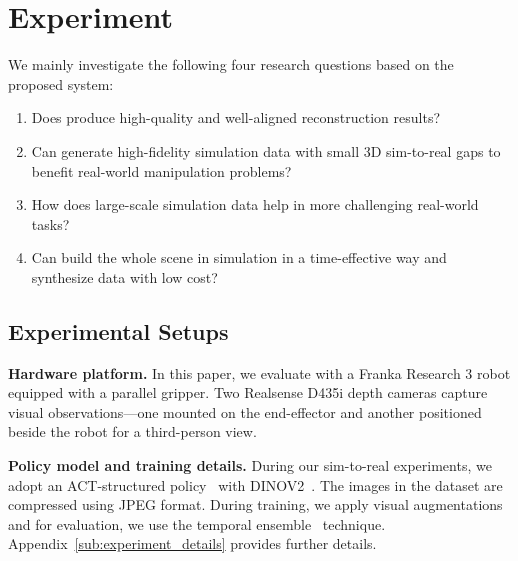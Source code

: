 \section{Experiment}
\label{sec:experiment}
We mainly investigate the following four research questions based on the proposed \our system:
\begin{enumerate}[label=\textbf{Q\arabic*}]
    \item Does \our produce high-quality and well-aligned reconstruction results?
    \label{ques:1}
    \item Can \our generate high-fidelity simulation data with small 3D sim-to-real gaps to benefit real-world manipulation problems?
    \label{ques:2}
    \item How does large-scale simulation data help in more challenging real-world tasks?
    \label{ques:3}
    \item Can \our build the whole scene in simulation in a time-effective way and synthesize data with low cost?
    \label{ques:4}
\end{enumerate}
\subsection{Experimental Setups}
\noindent\textbf{Hardware platform.}
In this paper, we evaluate \our with a Franka Research 3 robot equipped with a parallel gripper. 
Two Realsense D435i depth cameras capture visual observations—one mounted on the end-effector and another positioned beside the robot for a third-person view.


\noindent\textbf{Policy model and training details.}
During our sim-to-real experiments, we adopt an ACT-structured policy~\citep{zhao2023learning} with DINOV2~\citep{oquab2023dinov2}.
The images in the dataset are compressed using JPEG format.
During training, we apply visual augmentations and for evaluation, we use the temporal ensemble~\citep{zhao2023learning} technique.
Appendix~\ref{sub:experiment_details} provides further details. 

